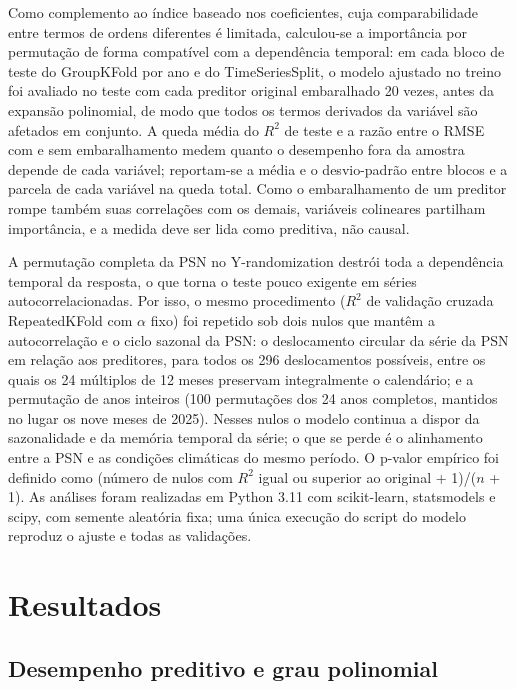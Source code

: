 \documentclass[a4paper,fleqn]{cas-dc}
\begin{document}
Como complemento ao índice baseado nos coeficientes, cuja comparabilidade entre termos de ordens diferentes é limitada, calculou-se a importância por permutação \citep{breiman2001} de forma compatível com a dependência temporal: em cada bloco de teste do GroupKFold por ano e do TimeSeriesSplit, o modelo ajustado no treino foi avaliado no teste com cada preditor original embaralhado 20 vezes, antes da expansão polinomial, de modo que todos os termos derivados da variável são afetados em conjunto. A queda média do $R^2$ de teste e a razão entre o RMSE com e sem embaralhamento medem quanto o desempenho fora da amostra depende de cada variável; reportam-se a média e o desvio-padrão entre blocos e a parcela de cada variável na queda total. Como o embaralhamento de um preditor rompe também suas correlações com os demais, variáveis colineares partilham importância, e a medida deve ser lida como preditiva, não causal.

A permutação completa da PSN no Y-randomization destrói toda a dependência temporal da resposta, o que torna o teste pouco exigente em séries autocorrelacionadas. Por isso, o mesmo procedimento ($R^2$ de validação cruzada RepeatedKFold com $\alpha$ fixo) foi repetido sob dois nulos que mantêm a autocorrelação e o ciclo sazonal da PSN: o deslocamento circular da série da PSN em relação aos preditores, para todos os 296 deslocamentos possíveis, entre os quais os 24 múltiplos de 12 meses preservam integralmente o calendário; e a permutação de anos inteiros (100 permutações dos 24 anos completos, mantidos no lugar os nove meses de 2025). Nesses nulos o modelo continua a dispor da sazonalidade e da memória temporal da série; o que se perde é o alinhamento entre a PSN e as condições climáticas do mesmo período. O p-valor empírico foi definido como (número de nulos com $R^2$ igual ou superior ao original + 1)/($n$ + 1). As análises foram realizadas em Python 3.11 com scikit-learn, statsmodels e scipy, com semente aleatória fixa; uma única execução do script do modelo reproduz o ajuste e todas as validações.

\section{Resultados}\label{sec:results}

\subsection{Desempenho preditivo e grau polinomial}
\end{document}
